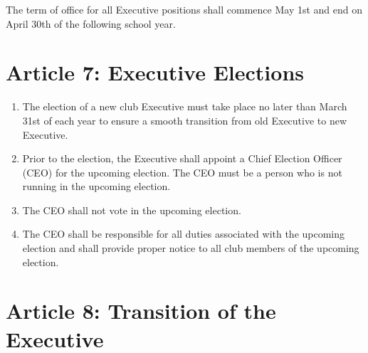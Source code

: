 \documentclass{article}
\begin{document}
The term of office for all Executive positions shall commence May 1st and end on April 30th of the following school year. 

\section{Article 7: Executive Elections}

\begin{enumerate}
    \item The election of a new club Executive must take place no later than March 31st of each year to ensure a smooth transition from old Executive to new Executive. 
    \item Prior to the election, the Executive shall appoint a Chief Election Officer (CEO) for the upcoming election. The CEO must be a person who is not running in the upcoming election. 
    \item The CEO shall not vote in the upcoming election. 
    \item The CEO shall be responsible for all duties associated with the upcoming election and shall provide proper notice to all club members of the upcoming election.
\end{enumerate}

\section{Article 8: Transition of the Executive}
\end{document}
